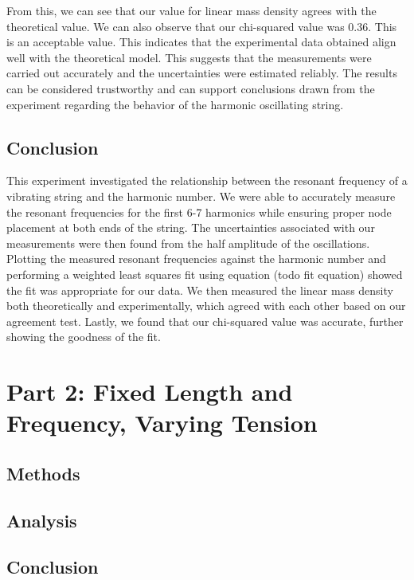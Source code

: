 \documentclass[11pt]{article}
\let\oldsection\section
\renewcommand\section{\clearpage\oldsection}
\begin{document}
    From this, we can see that our value for linear mass density agrees with the theoretical value. We can also observe that our chi-squared value was 0.36. This is an acceptable value. This indicates that the experimental data obtained align well with the theoretical model. This suggests that the measurements were carried out accurately and the uncertainties were estimated reliably. The results can be considered trustworthy and can support conclusions drawn from the experiment regarding the behavior of the harmonic oscillating string. 



    \subsection{Conclusion}\label{subsec:part_1_conclusion}
    This experiment investigated the relationship between the resonant frequency of a vibrating string and the harmonic number. We were able to accurately measure the resonant frequencies for the first 6-7 harmonics while ensuring proper node placement at both ends of the string. The uncertainties associated with our measurements were then found from the half amplitude of the oscillations. Plotting the measured resonant frequencies against the harmonic number and performing a weighted least squares fit using equation (todo fit equation) showed the fit was appropriate for our data. We then measured the linear mass density both theoretically and experimentally, which agreed with each other based on our agreement test. Lastly, we found that our chi-squared value was accurate, further showing the goodness of the fit.

    \section{Part 2: Fixed Length and Frequency, Varying Tension }\label{sec:part_2}
    \subsection{Methods}\label{subsec:part_2_methods}
    \subsection{Analysis}\label{subsec:part_2_analysis}
    \subsection{Conclusion}\label{subsec:part_2_conclusion}
\end{document}
